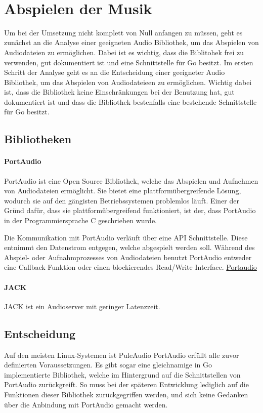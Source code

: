 \

\section{Abspielen der Musik}
Um bei der Umsetzung nicht komplett von Null anfangen zu müssen, geht es
zunächst an die Analyse einer geeigneten Audio Bibliothek, um das Abspielen von
Audiodateien zu ermöglichen. Dabei ist es wichtig, dass die Biblitohek frei zu
verwenden, gut dokumentiert ist und eine Schnittstelle für Go besitzt.  Im
ersten Schritt der Analyse geht es an die Entscheidung einer geeigneter Audio
Bibliothek, um das Abspielen von Audiodateieen zu ermöglichen. Wichtig dabei
ist, dass die Bibliothek keine Einschränkungen bei der Benutzung hat, gut
dokumentiert ist und dass die Bibliothek bestenfalls eine bestehende
Schnittstelle für Go besitzt.
\subsection{Bibliotheken}
\paragraph{PortAudio}
PortAudio ist eine Open Source Bibliothek, welche das Abspielen und Aufnehmen
von Audiodateien ermöglicht. Sie bietet eine plattformübergreifende Lösung,
wodurch sie auf den gängisten Betriebssystemen problemlos läuft. Einer der
Gründ dafür, dass sie plattformübergreifend funktioniert, ist der, dass
PortAudio in der Programmiersprache C geschrieben wurde. \hfill \break

Die Kommunikation mit PortAudio verläuft über eine \ac{API} Schnittstelle.
Diese entnimmt den Datenstrom entgegen, welche abgespielt werden soll. Während
des Abspiel- oder Aufnahmprozesses von Audiodateien benutzt PortAudio entweder
eine Callback-Funktion oder einen blockierendes Read/Write Interface.
\href{http://www.portaudio.com/}{Portaudio}

\paragraph{JACK}
JACK ist ein Audioserver mit geringer Latenzzeit. 

\subsection{Entscheidung}
Auf den meisten Linux-Systemen ist PuleAudio
PortAudio erfüllt alle zuvor definierten Voraussetzungen. Es gibt sogar eine
gleichnamige in Go implementierte Bibliothek, welche im Hintergrund auf die
Schnittstellen von PortAudio zurückgreift. So muss bei der späteren Entwicklung
lediglich auf die Funktionen dieser Bibliothek zurückgegriffen werden, und sich
keine Gedanken über die Anbindung mit PortAudio gemacht werden. 


